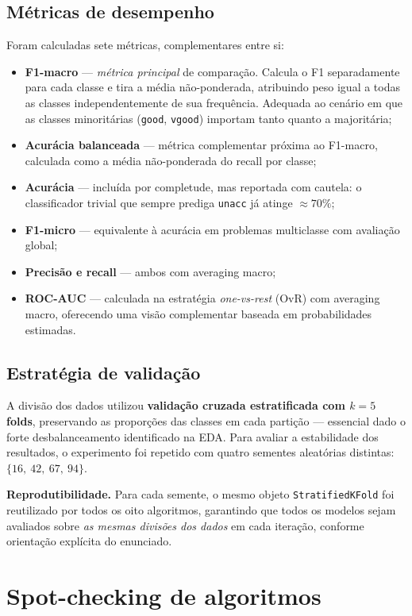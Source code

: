 \documentclass[11pt,a4paper]{article}
\newcommand{\code}[1]{\texttt{\small #1}}
\begin{document}
\subsection{Métricas de desempenho}
Foram calculadas sete métricas, complementares entre si:
\begin{itemize}
\item \textbf{F1-macro} --- \emph{métrica principal} de comparação. Calcula o F1 separadamente para cada classe e tira a média não-ponderada, atribuindo peso igual a todas as classes independentemente de sua frequência. Adequada ao cenário em que as classes minoritárias (\code{good}, \code{vgood}) importam tanto quanto a majoritária;
\item \textbf{Acurácia balanceada} --- métrica complementar próxima ao F1-macro, calculada como a média não-ponderada do recall por classe;
\item \textbf{Acurácia} --- incluída por completude, mas reportada com cautela: o classificador trivial que sempre prediga \code{unacc} já atinge $\approx 70\%$;
\item \textbf{F1-micro} --- equivalente à acurácia em problemas multiclasse com avaliação global;
\item \textbf{Precisão e recall} --- ambos com averaging macro;
\item \textbf{ROC-AUC} --- calculada na estratégia \emph{one-vs-rest} (OvR) com averaging macro, oferecendo uma visão complementar baseada em probabilidades estimadas.
\end{itemize}

\subsection{Estratégia de validação}
A divisão dos dados utilizou \textbf{validação cruzada estratificada com $k = 5$ folds}, preservando as proporções das classes em cada partição --- essencial dado o forte desbalanceamento identificado na EDA. Para avaliar a estabilidade dos resultados, o experimento foi repetido com quatro sementes aleatórias distintas: $\{16,\ 42,\ 67,\ 94\}$.

\textbf{Reprodutibilidade.} Para cada semente, o mesmo objeto \code{StratifiedKFold} foi reutilizado por todos os oito algoritmos, garantindo que todos os modelos sejam avaliados sobre \emph{as mesmas divisões dos dados} em cada iteração, conforme orientação explícita do enunciado.

\section{Spot-checking de algoritmos}
\label{sec:spot_checking}
\end{document}
